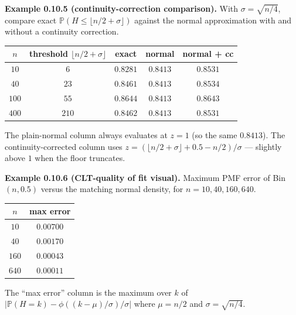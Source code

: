 \documentclass[
  10pt,
  twoside]{book}
\newcounter{none} %
\begin{document}
\textbf{Example 0.10.5 (continuity-correction comparison).} With
\(\sigma = \sqrt{n/4}\), compare exact
\(\mathbb{P}(H \leq \lfloor n/2 + \sigma \rfloor)\) against the normal
approximation with and without a continuity correction.

{\def\LTcaptype{none} %
\begin{table}[H]
\centering
\begin{tabular}{|c|c|c|c|c|}
\toprule
\(n\) & threshold \(\lfloor n/2{+}\sigma\rfloor\) & exact & normal & normal + cc \\
\midrule



\(10\) & \(6\) & \(0.8281\) & \(0.8413\) & \(0.8531\) \\
\(40\) & \(23\) & \(0.8461\) & \(0.8413\) & \(0.8534\) \\
\(100\) & \(55\) & \(0.8644\) & \(0.8413\) & \(0.8643\) \\
\(400\) & \(210\) & \(0.8462\) & \(0.8413\) & \(0.8531\) \\
\bottomrule
\end{tabular}
\end{table}
}

The plain-normal column always evaluates at \(z = 1\) (so the same
\(0.8413\)). The continuity-corrected column uses
\(z = (\lfloor n/2+\sigma\rfloor + 0.5 - n/2)/\sigma\) --- slightly
above \(1\) when the floor truncates.

\textbf{Example 0.10.6 (CLT-quality of fit visual).} Maximum PMF error
of Bin\((n, 0.5)\) versus the matching normal density, for
\(n = 10, 40, 160, 640\).

{\def\LTcaptype{none} %
\begin{table}[H]
\centering
\begin{tabular}{|c|c|}
\toprule
\(n\) & max error \\
\midrule



\(10\) & \(0.00700\) \\
\(40\) & \(0.00170\) \\
\(160\) & \(0.00043\) \\
\(640\) & \(0.00011\) \\
\bottomrule
\end{tabular}
\end{table}
}

The ``max error'' column is the maximum over \(k\) of
\(\lvert\mathbb{P}(H=k) - \phi((k-\mu)/\sigma)/\sigma\rvert\) where
\(\mu = n/2\) and \(\sigma = \sqrt{n/4}\).
\end{document}
